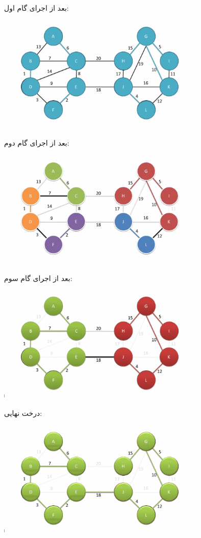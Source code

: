 \documentclass[11pt, oneside]{article}
\begin{document}
بعد از اجرای گام اول:
\begin{center}
    \includegraphics[width=10cm]{resources/step1.png}\\[\bigskipamount]
\end{center}

بعد از اجرای گام دوم:
\begin{center}
    \includegraphics[width=10cm]{resources/step2.png}\\[\bigskipamount]
\end{center}

\pagebreak
بعد از اجرای گام سوم:
\begin{center}
    \includegraphics[width=10cm]{resources/step3.png}\\[\bigskipamount]
\end{center}

درخت نهایی:
\begin{center}
    \includegraphics[width=10cm]{resources/output-mst.png}\\[\bigskipamount]
\end{center}
\end{document}
